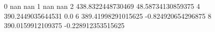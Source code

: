 0 nan nan
1 nan nan
2 438.8322448730469 48.58734130859375
4 390.2449035644531 0.0
6 389.41998291015625 -0.824920654296875
8 390.0159912109375 -0.228912353515625
